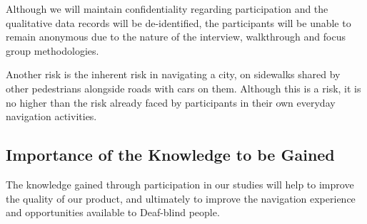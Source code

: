 Although we will maintain confidentiality regarding participation and the qualitative data records will be de-identified, the participants will be unable to remain anonymous due to the nature of the interview, walkthrough and focus group methodologies.

Another risk is the inherent risk in navigating a city, on sidewalks shared by other pedestrians alongside roads with cars on them. Although this is a risk, it is no higher than the risk already faced by participants in their own everyday navigation activities. 


\subsection{Importance of the Knowledge to be Gained}



The knowledge gained through participation in our studies will help to improve the quality of our product, and ultimately to improve the navigation experience and opportunities available to Deaf-blind people. 

